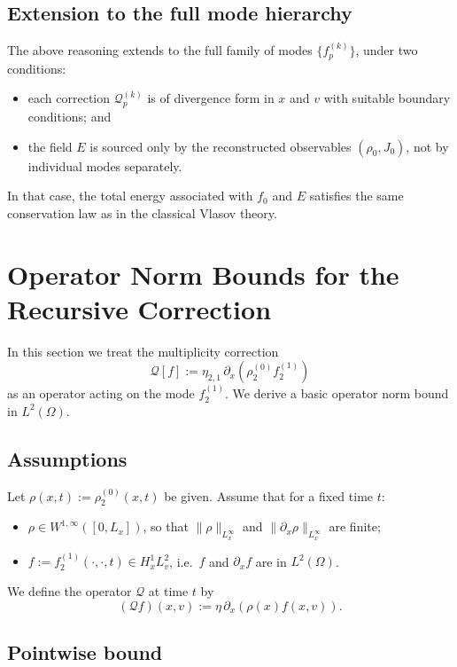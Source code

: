 \documentclass[11pt]{article}
\begin{document}
\subsection{Extension to the full mode hierarchy}

The above reasoning extends to the full family of modes $\{f_p^{(k)}\}$, under
two conditions:
\begin{itemize}
  \item each correction $\mathcal{Q}_p^{(k)}$ is of divergence form in $x$ and
        $v$ with suitable boundary conditions; and
  \item the field $E$ is sourced only by the reconstructed observables
        $(\rho_0, J_0)$, not by individual modes separately.
\end{itemize}
In that case, the total energy associated with $f_0$ and $E$ satisfies the
same conservation law as in the classical Vlasov theory.

\section{Operator Norm Bounds for the Recursive Correction}

In this section we treat the multiplicity correction
\[
  \mathcal{Q}[f] := \eta_{2,1}\,\partial_x(\rho_2^{(0)} f_2^{(1)})
\]
as an operator acting on the mode $f_2^{(1)}$. We derive a basic operator norm
bound in $L^2(\Omega)$.

\subsection{Assumptions}

Let $\rho(x,t) := \rho_2^{(0)}(x,t)$ be given. Assume that for a fixed time
$t$:
\begin{itemize}
  \item $\rho \in W^{1,\infty}([0,L_x])$, so that
        $\|\rho\|_{L^\infty_x}$ and $\|\partial_x \rho\|_{L^\infty_x}$ are
        finite;
  \item $f := f_2^{(1)}(\cdot,\cdot,t) \in H^1_x L^2_v$, i.e.\ $f$ and
        $\partial_x f$ are in $L^2(\Omega)$.
\end{itemize}
We define the operator $\mathcal{Q}$ at time $t$ by
\[
  (\mathcal{Q} f)(x,v) := \eta\,\partial_x(\rho(x) f(x,v)).
\]

\subsection{Pointwise bound}
\end{document}
